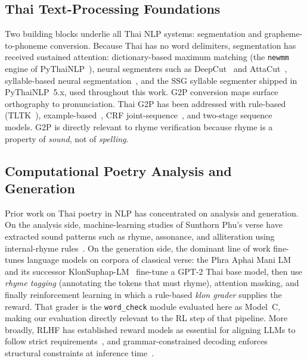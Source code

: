 \documentclass[conference]{IEEEtran}
\begin{document}
\subsection{Thai Text-Processing Foundations}

Two building blocks underlie all Thai NLP systems: segmentation and
grapheme-to-phoneme conversion. Because Thai has no word delimiters,
segmentation has received sustained attention: dictionary-based maximum
matching (the \texttt{newmm} engine of PyThaiNLP~\cite{pythainlp}),
neural segmenters such as DeepCut~\cite{deepcut} and
AttaCut~\cite{attacut}, syllable-based neural
segmentation~\cite{chormai2020syllable}, and the SSG syllable segmenter
shipped in PyThaiNLP~5.x, used throughout this work. G2P conversion maps
surface orthography to pronunciation. Thai G2P has been addressed with
rule-based (TLTK~\cite{tltk}), example-based~\cite{charoenpornsawat2006},
CRF joint-sequence~\cite{saychum2016}, and two-stage
sequence~\cite{rugchatjaroen2019} models. G2P is directly relevant to rhyme
verification because rhyme is a property of \emph{sound}, not of \emph{spelling}.

\subsection{Computational Poetry Analysis and Generation}

Prior work on Thai poetry in NLP has concentrated on analysis and
generation. On the analysis side, machine-learning studies of Sunthorn
Phu's verse have extracted sound patterns such as rhyme, assonance, and
alliteration using internal-rhyme rules~\cite{suksanguan2021}. On the
generation side, the dominant line of work fine-tunes language models on
corpora of classical verse: the Phra Aphai Mani LM~\cite{phraaphai} and its
successor KlonSuphap-LM~\cite{klonsuphap} fine-tune a GPT-2 Thai base
model, then use \emph{rhyme tagging} (annotating the tokens that must
rhyme), attention masking, and finally reinforcement learning in which a
rule-based \emph{klon grader} supplies the reward. That grader is the
\texttt{word\_check} module evaluated here as Model~C, making our
evaluation directly relevant to the RL step of that pipeline. More
broadly, RLHF has established reward models as essential for aligning LLMs
to follow strict requirements~\cite{ouyang2022}, and grammar-constrained decoding
enforces structural constraints at inference time~\cite{geng2023}.
\end{document}
